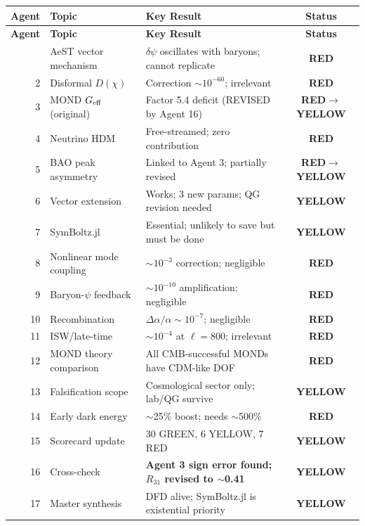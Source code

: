 \documentclass[11pt,a4paper]{article}
\newcommand{\YELLOW}{\textcolor{dfdyellow}{\textbf{YELLOW}}}
\newcommand{\RED}{\textcolor{dfdred}{\textbf{RED}}}
\begin{document}
\begin{longtable}{rllc}
\toprule
\textbf{Agent} & \textbf{Topic} & \textbf{Key Result} & \textbf{Status} \\
\midrule
\endfirsthead
\midrule
\textbf{Agent} & \textbf{Topic} & \textbf{Key Result} & \textbf{Status} \\
\midrule
\endhead
\bottomrule
\endlastfoot
1 & AeST vector mechanism & $\delta\psi$ oscillates with baryons; cannot replicate & \RED \\
2 & Disformal $D(\chi)$ & Correction $\sim 10^{-60}$; irrelevant & \RED \\
3 & MOND $G_{\rm eff}$ (original) & Factor 5.4 deficit (REVISED by Agent 16) & \RED$\to$\YELLOW \\
4 & Neutrino HDM & Free-streamed; zero contribution & \RED \\
5 & BAO peak asymmetry & Linked to Agent 3; partially revised & \RED$\to$\YELLOW \\
6 & Vector extension & Works; 3 new params; QG revision needed & \YELLOW \\
7 & SymBoltz.jl & Essential; unlikely to save but must be done & \YELLOW \\
8 & Nonlinear mode coupling & $\sim 10^{-3}$ correction; negligible & \RED \\
9 & Baryon-$\psi$ feedback & $\sim 10^{-10}$ amplification; negligible & \RED \\
10 & Recombination & $\Delta\alpha/\alpha \sim 10^{-7}$; negligible & \RED \\
11 & ISW/late-time & $\sim 10^{-4}$ at $\ell = 800$; irrelevant & \RED \\
12 & MOND theory comparison & All CMB-successful MONDs have CDM-like DOF & \RED \\
13 & Falsification scope & Cosmological sector only; lab/QG survive & \YELLOW \\
14 & Early dark energy & $\sim$25\% boost; needs $\sim$500\% & \RED \\
15 & Scorecard update & 30 GREEN, 6 YELLOW, 7 RED & \YELLOW \\
16 & Cross-check & \textbf{Agent 3 sign error found; $R_{31}$ revised to $\sim$0.41} & \YELLOW \\
17 & Master synthesis & DFD alive; SymBoltz.jl is existential priority & \YELLOW \\
\end{longtable}
\end{document}
